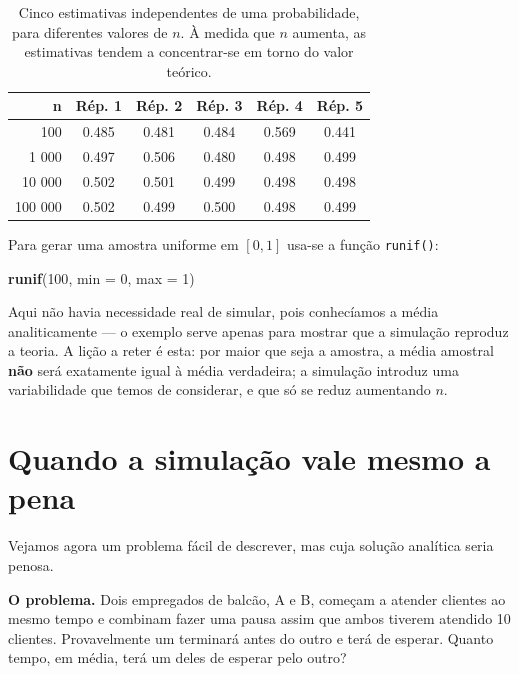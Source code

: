 \documentclass[
  portuguese,
  11pt,
  openany]{book}
\newenvironment{Shaded}{\begin{snugshade}}{\end{snugshade}}
\newcommand{\AttributeTok}[1]{\textcolor[rgb]{0.13,0.29,0.53}{#1}}
\newcommand{\DecValTok}[1]{\textcolor[rgb]{0.00,0.00,0.81}{#1}}
\newcommand{\FunctionTok}[1]{\textcolor[rgb]{0.13,0.29,0.53}{\textbf{#1}}}
\newcommand{\NormalTok}[1]{#1}
\begin{document}
\begin{table}

\caption{\label{tab:tab-lln-repeticoes}Cinco estimativas independentes de uma probabilidade, para diferentes valores de $n$. À medida que $n$ aumenta, as estimativas tendem a concentrar-se em torno do valor teórico.}
\centering
\begin{tabular}[t]{r|c|c|c|c|c}
\hline
n & Rép. 1 & Rép. 2 & Rép. 3 & Rép. 4 & Rép. 5\\
\hline
100 & 0.485 & 0.481 & 0.484 & 0.569 & 0.441\\
\hline
1 000 & 0.497 & 0.506 & 0.480 & 0.498 & 0.499\\
\hline
10 000 & 0.502 & 0.501 & 0.499 & 0.498 & 0.498\\
\hline
100 000 & 0.502 & 0.499 & 0.500 & 0.498 & 0.499\\
\hline
\end{tabular}
\end{table}

Para gerar uma amostra uniforme em \([0, 1]\) usa-se a função \texttt{runif()}:

\begin{Shaded}
\begin{Highlighting}[]
\FunctionTok{runif}\NormalTok{(}\DecValTok{100}\NormalTok{, }\AttributeTok{min =} \DecValTok{0}\NormalTok{, }\AttributeTok{max =} \DecValTok{1}\NormalTok{)}
\end{Highlighting}
\end{Shaded}

Aqui não havia necessidade real de simular, pois conhecíamos a média analiticamente ---
o exemplo serve apenas para mostrar que a simulação reproduz a teoria. A lição a reter
é esta: por maior que seja a amostra, a média amostral \textbf{não} será exatamente igual à
média verdadeira; a simulação introduz uma variabilidade que temos de considerar, e que
só se reduz aumentando \(n\).

\section{Quando a simulação vale mesmo a pena}\label{quando-a-simulauxe7uxe3o-vale-mesmo-a-pena}

Vejamos agora um problema fácil de descrever, mas cuja solução analítica seria penosa.

\textbf{O problema.} Dois empregados de balcão, A e B, começam a atender clientes ao mesmo
tempo e combinam fazer uma pausa assim que ambos tiverem atendido 10 clientes.
Provavelmente um terminará antes do outro e terá de esperar. Quanto tempo, em média,
terá um deles de esperar pelo outro?
\end{document}
